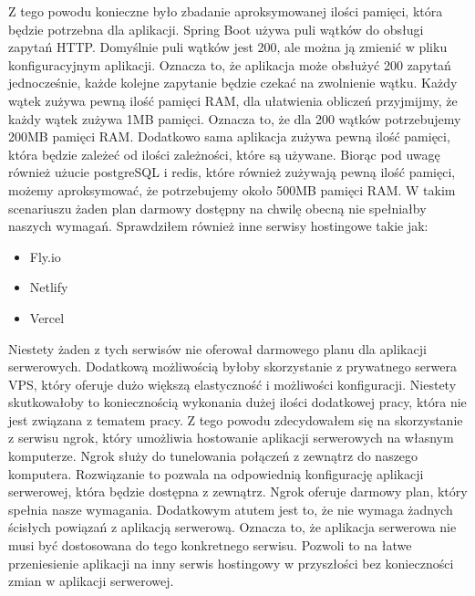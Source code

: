 Z tego powodu konieczne było zbadanie aproksymowanej ilości pamięci, która będzie potrzebna dla aplikacji.
Spring Boot używa puli wątków do obsługi zapytań HTTP.
Domyślnie puli wątków jest 200, ale można ją zmienić w pliku konfiguracyjnym aplikacji.
\cite{springBootThreadPool}
Oznacza to, że aplikacja może obsłużyć 200 zapytań jednocześnie, każde kolejne zapytanie będzie czekać na zwolnienie wątku.
Każdy wątek zużywa pewną ilość pamięci RAM, dla ułatwienia obliczeń przyjmijmy, że każdy wątek zużywa 1MB pamięci.
Oznacza to, że dla 200 wątków potrzebujemy 200MB pamięci RAM.
Dodatkowo sama aplikacja zużywa pewną ilość pamięci, która będzie zależeć od ilości zależności, które są używane.
Biorąc pod uwagę również użucie postgreSQL i redis, które również zużywają pewną ilość pamięci, możemy aproksymować, że potrzebujemy około 500MB pamięci RAM.
W takim scenariuszu żaden plan darmowy dostępny na chwilę obecną nie spełniałby naszych wymagań.
Sprawdziłem również inne serwisy hostingowe takie jak:
\begin{itemize}
    \item Fly.io
    \item Netlify
    \item Vercel
\end{itemize}
Niestety żaden z tych serwisów nie oferował darmowego planu dla aplikacji serwerowych.
Dodatkową możliwością byłoby skorzystanie z prywatnego serwera VPS, który oferuje dużo większą elastyczność i możliwości konfiguracji.
Niestety skutkowałoby to koniecznością wykonania dużej ilości dodatkowej pracy, która nie jest związana z tematem pracy.
Z tego powodu zdecydowałem się na skorzystanie z serwisu ngrok, który umożliwia hostowanie aplikacji serwerowych na własnym komputerze.
\cite{ngrok}
Ngrok służy do tunelowania połączeń z zewnątrz do naszego komputera.
Rozwiązanie to pozwala na odpowiednią konfigurację aplikacji serwerowej, która będzie dostępna z zewnątrz.
Ngrok oferuje darmowy plan, który spełnia nasze wymagania.
Dodatkowym atutem jest to, że nie wymaga żadnych ścisłych powiązań z aplikacją serwerową.
Oznacza to, że aplikacja serwerowa nie musi być dostosowana do tego konkretnego serwisu.
Pozwoli to na łatwe przeniesienie aplikacji na inny serwis hostingowy w przyszłości bez konieczności zmian w aplikacji serwerowej.
\clearpage